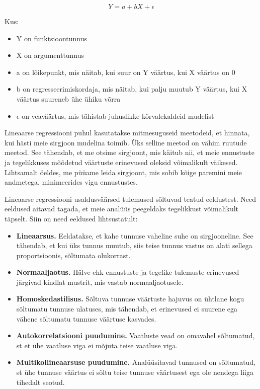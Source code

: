 \documentclass[
]{book}
\providecommand{\tightlist}{%
  \setlength{\itemsep}{0pt}\setlength{\parskip}{0pt}}
\begin{document}
\[Y = a + bX + \epsilon \]

Kus:

\begin{itemize}
\tightlist
\item
  Y on funktsioontunnus
\item
  X on argumenttunnus
\item
  a on lõikepunkt, mis näitab, kui suur on Y väärtus, kui X väärtus on 0
\item
  b on regresseerimiskordaja, mis näitab, kui palju muutub Y väärtus, kui X väärtus suureneb ühe ühiku võrra
\item
  \(\epsilon\) on veaväärtus, mis tähistab juhuslikke kõrvalekaldeid mudelist
\end{itemize}

Lineaarse regressiooni puhul kasutatakse mitmesuguseid meetodeid, et hinnata, kui hästi meie sirgjoon mudelina toimib. Üks selline meetod on vähim ruutude meetod. See tähendab, et me otsime sirgjoont, mis käitub nii, et meie ennustuste ja tegelikkuses mõõdetud väärtuste erinevused oleksid võimalikult väikesed. Lihtsamalt öeldes, me püüame leida sirgjoont, mis sobib kõige paremini meie andmetega, minimeerides vigu ennustustes.

Lineaarse regressiooni usaldusväärsed tulemused sõltuvad teatud eeldustest. Need eeldused aitavad tagada, et meie analüüs peegeldaks tegelikkust võimalikult täpselt. Siin on need eeldused lihtsustatult:

\begin{itemize}
\item
  \textbf{Lineaarsus.} Eeldatakse, et kahe tunnuse vaheline suhe on sirgjooneline. See tähendab, et kui üks tunnus muutub, siis teise tunnus vastus on alati sellega proportsioonis, sõltumata olukorrast.
\item
  \textbf{Normaaljaotus.} Hälve ehk ennustuste ja tegelike tulemuste erinevused järgivad kindlat mustrit, mis vastab normaaljaotusele.
\item
  \textbf{Homoskedastilisus.} Sõltuva tunnuse väärtuste hajuvus on ühtlane kogu sõltumatu tunnuse ulatuses, mis tähendab, et erinevused ei suurene ega vähene sõltumatu tunnuse väärtuse kasvades.
\item
  \textbf{Autokorrelatsiooni puudumine.} Vaatluste vead on omavahel sõltumatud, st et ühe vaatluse viga ei mõjuta teise vaatluse viga.
\item
  \textbf{Multikollineaarsuse puudumine.} Analüüsitavad tunnused on sõltumatud, st ühe tunnuse väärtus ei sõltu teise tunnuse väärtusest ega ole nendega liiga tihedalt seotud.
\end{itemize}
\end{document}
